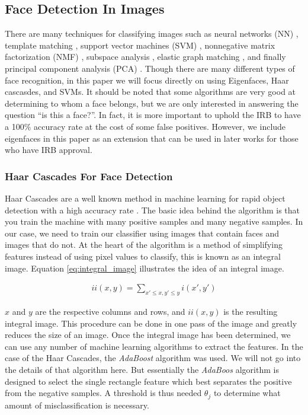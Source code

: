 \documentclass[
	submission,
	final,
	notitlepage,
	narroweqnarray,
	inline,
	twoside,
	]{ieee}
\begin{document}
\subsection{Face Detection In Images}
There are many techniques for classifying images such as neural
networks (NN) \cite{face_neural_net}, template matching \cite{face_template}, support vector machines (SVM) \cite{face_svm}, 
nonnegative matrix factorization (NMF) \cite{face_mat_fact}, subspace analysis \cite{face_subspace_analysis}, 
elastic graph matching \cite{face_elastic_bunch}, and finally principal component analysis (PCA) \cite{face_kpca}. 
Though there are many different types of face recognition, in this paper we 
will focus directly on using Eigenfaces, Haar cascasdes, and SVMs. It should be noted 
that some algorithms are very good at determining to whom a face
belongs, but we are only interested in answering the question  
``is this a face?''. In fact, it is more important to uphold the IRB
to have a 100\% accuracy rate at the cost of some false positives.
However, we include eigenfaces in this paper as 
an extension that can be used in later works for those who have IRB approval. 

\subsubsection{Haar Cascades For Face Detection}
Haar Cascades are a well known method in machine learning for rapid object
detection with a high accuracy rate \cite{haar_cascades}. The basic idea
behind the algorithm is that you train the machine with many positive samples
and many negative samples. In our case, we need to train our classifier using
images that contain faces and images that do not. At the heart of the algorithm
is a method of simplifying features instead of using pixel values to classify, 
this is known as an integral image. Equation \ref{eq:integral_image} illustrates
the idea of an integral image. 


\begin{align}
  ii(x,y) = \sum_{x' \leq x, y' \leq y} i(x', y') \label{eq:integral_image}
\end{align}

$x$ and $y$ are the respective columns and rows, and $ii(x,y)$ is the resulting integral
image. This procedure can be done in one pass of the image and greatly reduces
the size of an image. Once the integral image has been determined, we can use
any number of machine learning algorithms to extract the features. In the case of
the Haar Cascades, the \textit{AdaBoost} algorithm was used. We will not go
into the details of that algorithm here. But essentially the \textit{AdaBoos} algorithm 
is designed to select the single rectangle feature which best separates
the positive from the negative samples. A threshold is thus needed $\theta_j$
to determine what amount of misclassification is necessary. 
\end{document}
